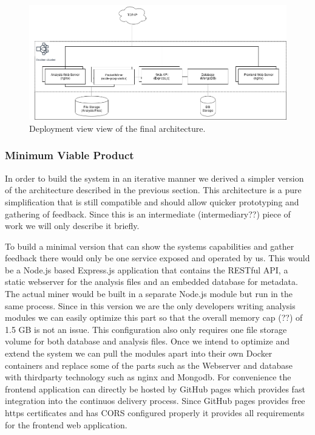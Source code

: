\begin{figure}
    \centering
    \includegraphics[width=16cm]{images/deploymentviewprod.png}
    \caption{Deployment view view of the final architecture.}
    \label{fig:deploymentviewprod}
\end{figure}


\subsubsection{Minimum Viable Product}
In order to build the system in an iterative manner we derived a simpler version of the architecture described in the previous section. This architecture is a pure simplification that is still compatible and should allow quicker prototyping and gathering of feedback. Since this is an intermediate (intermediary??) piece of work we will only describe it briefly.

To build a minimal version that can show the systems capabilities and gather feedback there would only be one service exposed and operated by us. This would be a Node.js based Express.js application that contains the RESTful API, a static webserver for the analysis files and an embedded database for metadata. The actual miner would be built in a separate Node.js module but run in the same process. Since in this version we are the only developers writing analysis modules we can easily optimize this part so that the overall memory cap (??) of 1.5 GB is not an issue. This configuration also only requires one file storage volume for both database and analysis files. Once we intend to optimize and extend the system we can pull the modules apart into their own Docker containers and replace some of the parts such as the Webserver and database with thirdparty technology such as nginx and Mongodb.
For convenience the frontend application can directly be hosted by GitHub pages which provides fast integration into the continuos delivery process. Since GitHub pages provides free https certificates and has CORS configured properly it provides all requirements for the frontend web application.

